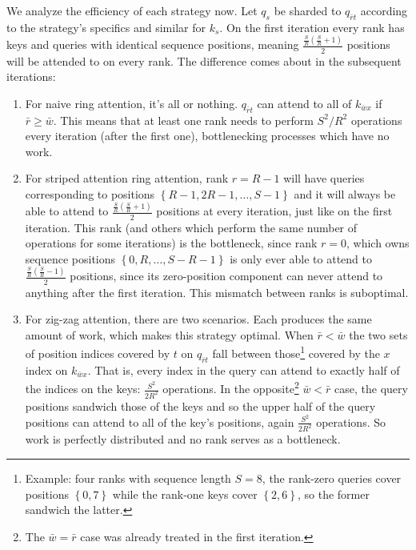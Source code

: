 \documentclass[11pt]{article}
\begin{document}
We analyze the efficiency of each strategy now. Let $ q _{ s } $ be sharded to $ q _{ \bar{r}t }
$ according to the strategy's specifics and similar for $ k _{ s } $. On the first iteration every
rank has keys and queries with identical sequence positions, meaning $ \frac{ \frac{ S }{ R }\left (
\frac{ S }{ R }+1 \right ) }{2  } $ positions will be attended to on every rank. The difference
comes about in the subsequent iterations:
\begin{enumerate}
    \item For naive ring attention, it's all or nothing. $ q _{ \bar{r}t } $ can attend to all of $k
        _{ \bar{w}x } $ if $ \bar{r}\ge \bar{w} $. This means that at least one rank needs to
        perform $ S ^{ 2 } / R ^{ 2 } $ operations every iteration (after the first one),
        bottlenecking processes which have no work.
    \item For striped attention  ring attention, rank $ r= R-1 $ will have queries corresponding to
        positions $ \left \{ R-1, 2R-1, \ldots , S-1 \right \} $ and it will always be able to
        attend to $ \frac{ \frac{ S }{ R }\left ( \frac{ S }{ R }+1 \right ) }{2  }  $ positions at
        every iteration, just like on the first iteration. This rank (and others which perform the
        same number of operations for some iterations) is the bottleneck, since rank $ r=0 $, which
        owns sequence positions $ \left \{ 0, R, \ldots  , S-R-1 \right \} $ is only ever able to
        attend to $  \frac{ \frac{ S }{ R }\left ( \frac{ S }{ R }-1 \right ) }{2  }   $ positions,
        since its zero-position component can never attend to anything after the first iteration.
        This mismatch between ranks is suboptimal.
    \item For zig-zag attention, there are two scenarios. Each produces the same amount of
        work, which makes this strategy optimal. When $ \bar{r} <  \bar{w} $ the two sets of
        position indices covered by $ t $ on $ q _{ \bar{r}t } $ fall between
        those\footnote{Example: four ranks with sequence length $ S=8 $, the rank-zero queries cover
            positions $ \left \{ 0,  7 \right \} $ while the rank-one keys cover $ \left \{  2,  6
        \right \} $, so the former sandwich the latter.} covered by the $ x $ index on $ k _{
        \bar{w}x } $. That is, every index in the query can attend to exactly half of the indices on
        the keys: $ \frac{ S ^{ 2 } }{ 2R ^{ 2 } } $ operations. In the opposite\footnote{The $
        \bar{w}=\bar{r} $ case was already treated in the first iteration.} $ \bar{w} <  \bar{r} $
        case, the query positions sandwich those of the keys and so the upper half of the query
        positions can attend to all of the key's positions, again $ \frac{ S ^{ 2 } }{ 2R ^{ 2 } } $
        operations. So work is perfectly distributed and no rank serves as a bottleneck.

\end{enumerate}
\end{document}
